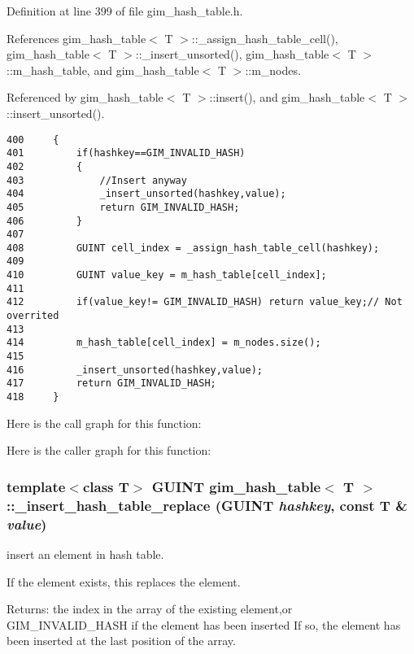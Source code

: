 Definition at line 399 of file gim\_\-hash\_\-table.h.

References gim\_\-hash\_\-table$<$ T $>$::\_\-assign\_\-hash\_\-table\_\-cell(), gim\_\-hash\_\-table$<$ T $>$::\_\-insert\_\-unsorted(), gim\_\-hash\_\-table$<$ T $>$::m\_\-hash\_\-table, and gim\_\-hash\_\-table$<$ T $>$::m\_\-nodes.

Referenced by gim\_\-hash\_\-table$<$ T $>$::insert(), and gim\_\-hash\_\-table$<$ T $>$::insert\_\-unsorted().

\begin{Code}\begin{verbatim}400     {
401         if(hashkey==GIM_INVALID_HASH)
402         {
403             //Insert anyway
404             _insert_unsorted(hashkey,value);
405             return GIM_INVALID_HASH;
406         }
407 
408         GUINT cell_index = _assign_hash_table_cell(hashkey);
409 
410         GUINT value_key = m_hash_table[cell_index];
411 
412         if(value_key!= GIM_INVALID_HASH) return value_key;// Not overrited
413 
414         m_hash_table[cell_index] = m_nodes.size();
415 
416         _insert_unsorted(hashkey,value);
417         return GIM_INVALID_HASH;
418     }
\end{verbatim}
\end{Code}




Here is the call graph for this function:

Here is the caller graph for this function:\hypertarget{classgim__hash__table_6ebfb7415bd946855ec5730651f7c191}{
\subsubsection[\_\-insert\_\-hash\_\-table\_\-replace]{\setlength{\rightskip}{0pt plus 5cm}template$<$class T$>$ GUINT {\bf gim\_\-hash\_\-table}$<$ T $>$::\_\-insert\_\-hash\_\-table\_\-replace (GUINT {\em hashkey}, \/  const T \& {\em value})}}
\label{classgim__hash__table_6ebfb7415bd946855ec5730651f7c191}


insert an element in hash table. 

If the element exists, this replaces the element. \begin{Desc}
\item[Returns:]the index in the array of the existing element,or GIM\_\-INVALID\_\-HASH if the element has been inserted If so, the element has been inserted at the last position of the array. \end{Desc}


